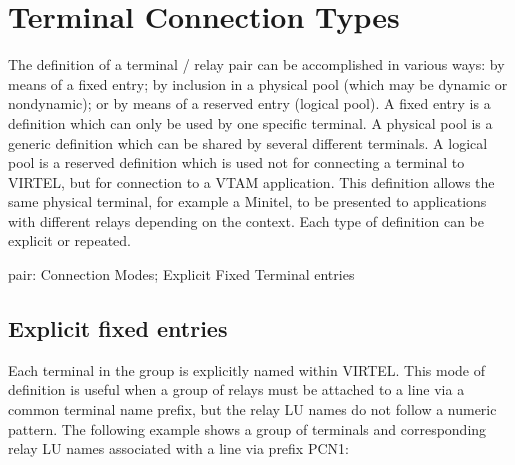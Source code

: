 \documentclass[letterpaper,10pt,english]{sphinxmanual}
\begin{document}
\section{Terminal Connection Types}
\label{\detokenize{connectivity_guide:terminal-connection-types}}\label{\detokenize{connectivity_guide:index-138}}
\sphinxAtStartPar
The definition of a terminal / relay pair can be accomplished in various ways: by means of a fixed entry; by inclusion in a physical pool (which may be dynamic or non\sphinxhyphen{}dynamic); or by means of a reserved entry (logical pool). A fixed entry is a definition which can only be used by one specific terminal. A physical pool is a generic definition which can be shared by several different terminals. A logical pool is a reserved definition which is used not for connecting a terminal to VIRTEL, but for connection to a VTAM application. This definition allows the same physical terminal, for example a Minitel, to be presented to applications with different relays depending on the context. Each type of definition can be explicit or repeated.
\begin{description}
\sphinxAtStartPar
pair: Connection Modes; Explicit Fixed Terminal entries

\end{description}


\subsection{Explicit fixed entries}
\label{\detokenize{connectivity_guide:explicit-fixed-entries}}
\sphinxAtStartPar
Each terminal in the group is explicitly named within VIRTEL. This mode of definition is useful when a group of relays must be attached to a line via a common terminal name prefix, but the relay LU names do not follow a numeric pattern. The following example shows a group of terminals and corresponding relay LU names associated with a line via prefix PCN1:
\end{document}

